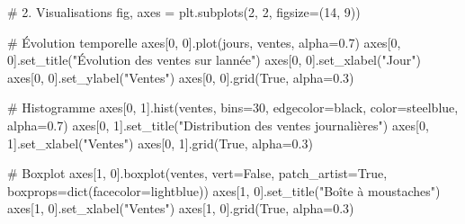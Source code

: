 \documentclass[
  french,
  11pt,
  a4paper,
]{scrbook}
\newenvironment{Shaded}{}{}
\newcommand{\BuiltInTok}[1]{\textcolor[rgb]{0.84,0.23,0.29}{#1}}
\newcommand{\CommentTok}[1]{\textcolor[rgb]{0.42,0.45,0.49}{#1}}
\newcommand{\DecValTok}[1]{\textcolor[rgb]{0.00,0.36,0.77}{#1}}
\newcommand{\FloatTok}[1]{\textcolor[rgb]{0.00,0.36,0.77}{#1}}
\newcommand{\NormalTok}[1]{\textcolor[rgb]{0.14,0.16,0.18}{#1}}
\newcommand{\OperatorTok}[1]{\textcolor[rgb]{0.14,0.16,0.18}{#1}}
\newcommand{\StringTok}[1]{\textcolor[rgb]{0.01,0.18,0.38}{#1}}
\newcommand{\VariableTok}[1]{\textcolor[rgb]{0.89,0.38,0.04}{#1}}
\begin{document}
\begin{tcolorbox}
\begin{Shaded}
\begin{Highlighting}[]
\CommentTok{\# 2. Visualisations}
\NormalTok{fig, axes }\OperatorTok{=}\NormalTok{ plt.subplots(}\DecValTok{2}\NormalTok{, }\DecValTok{2}\NormalTok{, figsize}\OperatorTok{=}\NormalTok{(}\DecValTok{14}\NormalTok{, }\DecValTok{9}\NormalTok{))}

\CommentTok{\# Évolution temporelle}
\NormalTok{axes[}\DecValTok{0}\NormalTok{, }\DecValTok{0}\NormalTok{].plot(jours, ventes, alpha}\OperatorTok{=}\FloatTok{0.7}\NormalTok{)}
\NormalTok{axes[}\DecValTok{0}\NormalTok{, }\DecValTok{0}\NormalTok{].set\_title(}\StringTok{"Évolution des ventes sur l\textquotesingle{}année"}\NormalTok{)}
\NormalTok{axes[}\DecValTok{0}\NormalTok{, }\DecValTok{0}\NormalTok{].set\_xlabel(}\StringTok{"Jour"}\NormalTok{)}
\NormalTok{axes[}\DecValTok{0}\NormalTok{, }\DecValTok{0}\NormalTok{].set\_ylabel(}\StringTok{"Ventes"}\NormalTok{)}
\NormalTok{axes[}\DecValTok{0}\NormalTok{, }\DecValTok{0}\NormalTok{].grid(}\VariableTok{True}\NormalTok{, alpha}\OperatorTok{=}\FloatTok{0.3}\NormalTok{)}

\CommentTok{\# Histogramme}
\NormalTok{axes[}\DecValTok{0}\NormalTok{, }\DecValTok{1}\NormalTok{].hist(ventes, bins}\OperatorTok{=}\DecValTok{30}\NormalTok{, edgecolor}\OperatorTok{=}\StringTok{\textquotesingle{}black\textquotesingle{}}\NormalTok{, color}\OperatorTok{=}\StringTok{\textquotesingle{}steelblue\textquotesingle{}}\NormalTok{, alpha}\OperatorTok{=}\FloatTok{0.7}\NormalTok{)}
\NormalTok{axes[}\DecValTok{0}\NormalTok{, }\DecValTok{1}\NormalTok{].set\_title(}\StringTok{"Distribution des ventes journalières"}\NormalTok{)}
\NormalTok{axes[}\DecValTok{0}\NormalTok{, }\DecValTok{1}\NormalTok{].set\_xlabel(}\StringTok{"Ventes"}\NormalTok{)}
\NormalTok{axes[}\DecValTok{0}\NormalTok{, }\DecValTok{1}\NormalTok{].grid(}\VariableTok{True}\NormalTok{, alpha}\OperatorTok{=}\FloatTok{0.3}\NormalTok{)}

\CommentTok{\# Boxplot}
\NormalTok{axes[}\DecValTok{1}\NormalTok{, }\DecValTok{0}\NormalTok{].boxplot(ventes, vert}\OperatorTok{=}\VariableTok{False}\NormalTok{, patch\_artist}\OperatorTok{=}\VariableTok{True}\NormalTok{, }
\NormalTok{                   boxprops}\OperatorTok{=}\BuiltInTok{dict}\NormalTok{(facecolor}\OperatorTok{=}\StringTok{\textquotesingle{}lightblue\textquotesingle{}}\NormalTok{))}
\NormalTok{axes[}\DecValTok{1}\NormalTok{, }\DecValTok{0}\NormalTok{].set\_title(}\StringTok{"Boîte à moustaches"}\NormalTok{)}
\NormalTok{axes[}\DecValTok{1}\NormalTok{, }\DecValTok{0}\NormalTok{].set\_xlabel(}\StringTok{"Ventes"}\NormalTok{)}
\NormalTok{axes[}\DecValTok{1}\NormalTok{, }\DecValTok{0}\NormalTok{].grid(}\VariableTok{True}\NormalTok{, alpha}\OperatorTok{=}\FloatTok{0.3}\NormalTok{)}


\end{Highlighting}
\end{Shaded}
\end{tcolorbox}
\end{document}
